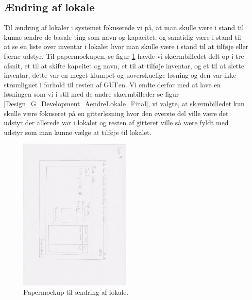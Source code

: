 \subsection{Ændring af lokale}
Til ændring af lokaler i systemet fokuserede vi på, at man skulle være i stand til kunne ændre de basale ting som navn og kapacitet, og samtidig være i stand til at se en liste over inventar i lokalet hvor man skulle være i stand til at tilføje eller fjerne udstyr. Til papermockupen, se figur \ref{Design_G_Development_AendreLokale} havde vi skærmbilledet delt op i tre afsnit, et til at skifte kapcitet og navn, et til at tilføje inventar, og et til at slette inventar, dette var en meget klumpet og uoverskuelige løsning og den var ikke strømlignet i forhold til resten af GUI'en. Vi endte derfor med at lave en løsningen som vi i stil med de andre skærmbilleder se figur \ref{Design_G_Development_AendreLokale_Final}, vi valgte, at skærmbilledet kun skulle være fokuseret på en gitterløsning hvor den øverste del ville være det udstyr der allerede var i lokalet og resten af gitteret ville så være fyldt med udstyr som man kunne vælge at tilføje til lokalet.

\begin{figure}[h!]
  \centering
    \includegraphics[width=0.5\textwidth]{Appendix/GUI-Prototype/PaperMockup/AendreLokale_001}
  \caption{Papermockup til ændring af lokale.}
\label{Design_G_Development_AendreLokale}
\end{figure} 